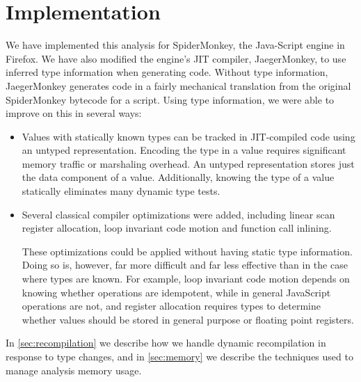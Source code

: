
\section{Implementation}
\label{sec:implementation}

We have implemented this analysis for SpiderMonkey, the Java-Script engine
in Firefox.
We have also modified the engine's JIT compiler, JaegerMonkey, to use
inferred type information when generating code.
Without type information, JaegerMonkey generates code in a fairly mechanical
translation from the original SpiderMonkey bytecode for a script.
Using type information, we were able to improve on this in several ways:

\begin{itemize}

\item Values with statically known types can be tracked in JIT-compiled code
using an untyped representation.
Encoding the type in a value requires significant memory traffic or
marshaling overhead.
An untyped representation stores just the data component of a value.
Additionally, knowing the type of a value statically eliminates many
dynamic type tests.

\item Several classical compiler optimizations were added,
including linear scan register allocation, loop invariant code motion
and function call inlining.

These optimizations could be applied without
having static type information.
Doing so is, however, far more difficult and far less effective than in
the case where types are known. For example, loop invariant code motion depends
on knowing whether operations
are idempotent, while in general JavaScript operations are not,
and register allocation requires types to determine whether values should
be stored in general purpose or floating point registers.

\end{itemize}

In \Section\ref{sec:recompilation} we describe how we handle dynamic recompilation in
response to type changes, and in \Section\ref{sec:memory} we describe the techniques
used to manage analysis memory usage.

